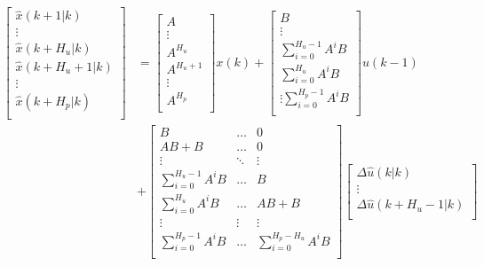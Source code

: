 \begin{equation}
\begin{aligned}
	  \begin{bmatrix}
	  \hat{x}(k+1|k) \\
	  \vdots \\
	  \hat{x}(k+H_u|k) \\
	  \hat{x}(k+H_u +1|k) \\
	  \vdots \\
	  \hat{x}(k+H_p|k) \\
	   \end{bmatrix}
	 &=
	\begin{bmatrix}
		A \\
		\vdots \\
		A^{H_u} \\
		A^{H_u+1} \\
		\vdots \\
		A^{H_p} \\
	\end{bmatrix}
	x(k)+
	\begin{bmatrix}
		B\\
		\vdots \\
		\sum_{i=0}^{H_u-1}A^i B \\
		\sum_{i=0}^{H_u}A^i B \\
		\vdots
		\sum_{i=0}^{H_p-1}A^i B \\
    \end{bmatrix}
    u(k-1) \\ &+ 
    \begin{bmatrix}
    	B & \hdots & 0 \\
    	AB+B & \hdots & 0 \\
    	\vdots & \ddots & \vdots \\
    	\sum_{i=0}^{H_u-1}A^i B & \hdots & B \\
    	\sum_{i=0}^{H_u}A^i B & \hdots & AB+B\\
    	\vdots & \vdots & \vdots \\
    	\sum_{i=0}^{H_p-1}A^i B & \hdots & \sum_{i=0}^{H_p-H_u}A^i B \\
	\end{bmatrix}
	\begin{bmatrix}
		\Delta \hat{u}(k|k)\\
		\vdots \\
		\Delta \hat{u}(k+H_u-1|k)\\
	\end{bmatrix}
	\end{aligned}
\end{equation}






